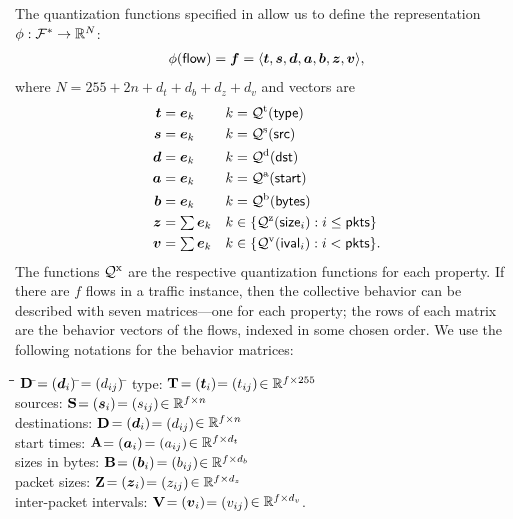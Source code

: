 \documentclass[twocolumn,final]{svjour3}
\begin{document}
The quantization functions specified in  allow us to define the representation $\phi: \mathcal{F}^* \to \mathbb{R}^N$: \begin{align}
\phi(\flow) = \vec{f} = \tuple{\vec{t},\vec{s},\vec{d},\vec{a},\vec{b},\vec{z},\vec{v}},
\end{align}
where $N=255+2n+d_t+d_b+d_z+d_v$ and vectors are
\begin{align*}
\vec{t} &= \e_k & k &= \Qf^{\text{t}}(\type) \\
\vec{s} &= \e_k & k &= \Qf^{\text{s}}(\src) \\
\vec{d} &= \e_k & k &= \Qf^{\text{d}}(\dst) \\
\vec{a} &= \e_k & k &= \Qf^{\text{a}}(\start) \\
\vec{b} &= \e_k & k &= \Qf^{\text{b}}(\bytes) \\
\vec{z} &= {\textstyle \sum \e_k} & k &\in \set{\Qf^{\text{z}}(\size_i) : i \le \pkts} \\
\vec{v} &= {\textstyle \sum \e_k} & k &\in \set{\Qf^{\text{v}}(\ival_i) : i <   \pkts}.
\end{align*}
The functions $\mathcal{Q}^\text{x}$ are the respective quantization functions for each property.
If there are $f$ flows in a traffic instance, then the collective behavior can be described with seven matrices---one for each property;
the rows of each matrix are the behavior vectors of the flows, indexed in some chosen order.
We use the following notations for the behavior matrices:
\vspace{-0.25em}
\begin{tabbing}
\hspace{1em}\=\bullet\hspace{0.5em}\=\hspace{9.75em}\=
$\mathbf{D}\:$\=$=\parensx{\vec{d}_i}\:$\=$={(d_{ij})}\:$\=\kill
\>\bullet\> type: \>$\mathbf{T}$\>$=\parensx{\vec{t}_i}$\>$={(t_{ij})}$\>$\in\mathbb{R}^{f \times 255}$\\
\>\bullet\> sources: \>$\mathbf{S}$\>$=\parensx{\vec{s}_i}$\>$={(s_{ij})}$\>$\in\mathbb{R}^{f \times n}$\\
\>\bullet\> destinations: \>$\mathbf{D}$\>$=\parensx{\vec{d}_i}$\>$={(d_{ij})}$\>$\in\mathbb{R}^{f \times n}$\\
\>\bullet\> start times: \>$\mathbf{A}$\>$=\parensx{\vec{a}_i}$\>$={(a_{ij})}$\>$\in\mathbb{R}^{f \times d_t}$\\
\>\bullet\> sizes in bytes: \>$\mathbf{B}$\>$=\parensx{\vec{b}_i}$\>$={(b_{ij})}$\>$\in\mathbb{R}^{f \times d_b}$\\
\>\bullet\> packet sizes: \>$\mathbf{Z}$\>$=\parensx{\vec{z}_i}$\>$={(z_{ij})}$\>$\in\mathbb{R}^{f \times d_z}$\\
\>\bullet\> inter-packet intervals: \>$\mathbf{V}$\>$=\parensx{\vec{v}_i}$\>$={(v_{ij})}$\>$\in\mathbb{R}^{f \times d_v}$.
\end{tabbing}
\end{document}
